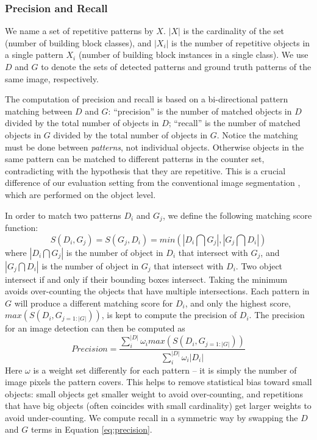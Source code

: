 \documentclass{acmtog}
\begin{document}
\subsubsection{Precision and Recall}

We name a set of repetitive patterns by $X$. $|X|$ is the cardinality of the set (number of building block classes), and $|X_{i}|$ is the number of repetitive objects in a single pattern $X_{i}$ (number of building block instances in a single class). We use $D$ and $G$ to denote the sets of detected patterns and ground truth patterns of the same image, respectively. 

The computation of precision and recall is based on a bi-directional pattern matching between $D$ and $G$: ``precision'' is the number of matched objects in $D$ divided by the total number of objects in $D$; ``recall'' is the number of matched objects in $G$ divided by the total number of objects in $G$. Notice the matching must be done between \emph{patterns}, not individual objects. Otherwise objects in the same pattern can be matched to different patterns in the counter set, contradicting with the hypothesis that they are repetitive. This is a crucial difference of our evaluation setting from the conventional image segmentation \cite{MartinFTM01}, which are performed on the object level. 

In order to match two patterns $D_{i}$ and $G_{j}$, we define the following matching score function:
%
\begin{equation}
S(D_{i}, G_{j}) = S(G_{j}, D_{i}) = min(|D_{i} \bigcap  G_{j}|, |G_{j} \bigcap D_{i}|)
\label{eq:match}
\end{equation}
%
where $|D_{i} \bigcap  G_{j}|$ is the number of object in $D_{i}$ that intersect with $G_{j}$, and $|G_{j} \bigcap  D_{i}|$ is the number of object in $G_{j}$ that intersect with $D_{i}$. Two object intersect if and only if their bounding boxes intersect. Taking the minimum avoids over-counting the objects that have multiple intersections. Each pattern in $G$ will produce a different matching score for $D_{i}$, and only the highest score, $max(S(D_{i}, G_{j = 1:|G|}))$, is kept to compute the precision of $D_{i}$. The precision for an image detection can then be computed as
%
\begin{equation}
Precision = \frac{\sum_i^{|D|}\omega_{i}max(S(D_{i}, G_{j = 1:|G|}))}{\sum_i^{|D|}\omega_{i}|D_{i}|}
\label{eq:precision}
\end{equation}
%
Here $\omega$ is a weight set differently for each pattern -- it is simply the number of image pixels the pattern covers. This helps to remove statistical bias toward small objects:  small objects get smaller weight to avoid over-counting, and repetitions that have big objects (often coincides with small cardinality) get larger weights to avoid under-counting. We compute recall in a symmetric way by swapping the $D$ and $G$ terms in Equation \ref{eq:precision}. 
\end{document}
